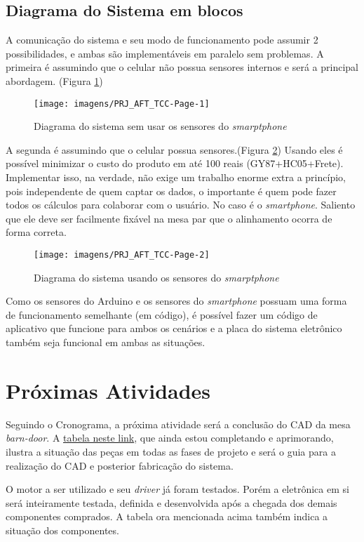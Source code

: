 \documentclass[a4paper, 12pt]{article}
\begin{document}
\subsection{Diagrama do Sistema em blocos}

A comunicação do sistema e seu modo de funcionamento pode assumir 2 possibilidades, e ambas são implementáveis em paralelo sem problemas. A primeira é assumindo que o celular não possua sensores internos e será a principal abordagem. (Figura \ref{fig:prjafttcc-page-1})

\begin{figure}[!htb]
	\centering
	\texttt{[image: imagens/PRJ\_AFT\_TCC-Page-1]}
	\caption{Diagrama do sistema sem usar os sensores do \textit{smarptphone}}
	\label{fig:prjafttcc-page-1}
\end{figure}


A segunda é assumindo que o celular possua sensores.(Figura \ref{fig:prjafttcc-page-2}) Usando eles é possível minimizar o custo do produto em até 100 reais (GY87+HC05+Frete). Implementar isso, na verdade, não exige um trabalho enorme extra a princípio, pois independente de quem captar os dados, o importante é quem pode fazer todos os cálculos para colaborar com o usuário. No caso é o \textit{smartphone}. Saliento que ele deve ser facilmente fixável na mesa par que o alinhamento ocorra de forma correta.

\begin{figure}[!htb]
	\centering
	\texttt{[image: imagens/PRJ\_AFT\_TCC-Page-2]}
	\caption{Diagrama do sistema usando os sensores do \textit{smarptphone}}
	\label{fig:prjafttcc-page-2}
\end{figure}

Como os sensores do Arduino e os sensores do \textit{smartphone} possuam uma forma de funcionamento semelhante (em código), é possível fazer um código de aplicativo que funcione para ambos os cenários e a placa do sistema eletrônico também seja funcional em ambas as situações.

\section{Próximas Atividades}

Seguindo o Cronograma, a próxima atividade será a conclusão do CAD da mesa \textit{barn-door}. A \href{https://docs.google.com/spreadsheets/d/1AbPNhJbIAHxrgyp-HbyYSLwaWb71SL8_rIbzwGyOWhE/edit?usp=sharing}{tabela neste link}, que ainda estou completando e aprimorando,
ilustra a situação das peças em todas as fases de projeto e será o guia para a realização do CAD e posterior fabricação do sistema. 

O motor a ser utilizado e seu \textit{driver} já foram testados. Porém a eletrônica em si será inteiramente testada, definida e desenvolvida após a chegada dos demais componentes comprados. A tabela ora mencionada acima também indica a situação dos componentes. 
\end{document}
